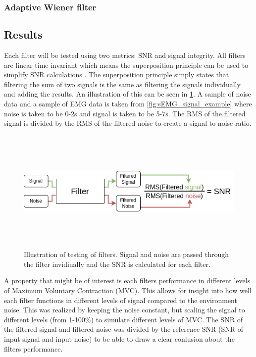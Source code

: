 \subsubsection{Adaptive Wiener filter}


\subsection{Results}
Each filter will be tested using two metrics: SNR and signal integrity. All filters are linear time invariant which means the superposition principle can be used to simplify SNR calculations \cite{wiki:lti_system}. The superposition principle simply states that filtering the sum of two signals is the same as filtering the signals individually and adding the results. An illustration of this can be seen in \ref{fig:filter_process}. A sample of noise data and a sample of EMG data is taken from \ref{fig:sEMG_signal_example} where noise is taken to be 0-2s and signal is taken to be 5-7s. The RMS of the filtered signal is divided by the RMS of the filtered noise to create a signal to noise ratio.

\begin{figure}[h!t]
	\begin{center}
		\includegraphics[height=60mm]{images/filter_process.png}
	\end{center}
	\caption{Illustration of testing of filters. Signal and noise are passed through the filter invidiually and the SNR is calculated for each filter.}
	\label{fig:filter_process}
\end{figure}

A property that might be of interest is each filters performance in different levels of Maximum Voluntary Contraction (MVC). This allows for insight into how well each filter functions in different levels of signal compared to the environment noise. This was realized by keeping the noise constant, but scaling the signal to different levels (from 1-100\%) to simulate different levels of MVC. The SNR of the filtered signal and filtered noise was divided by the reference SNR (SNR of input signal and input noise) to be able to draw a clear conlusion about the filters performance.

